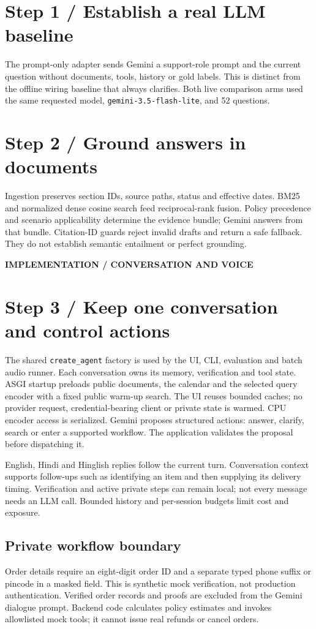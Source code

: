 \documentclass[10pt,a4paper]{article}
\newcommand{\tagline}[1]{{\small\bfseries\color{teal}#1}\par}
\begin{document}
\section{Step 1 / Establish a real LLM baseline}
The prompt-only adapter sends Gemini a support-role prompt and the current
question without documents, tools, history or gold labels. This is distinct from
the offline wiring baseline that always clarifies. Both live comparison arms
used the same requested model, \texttt{gemini-3.5-flash-lite}, and 52 questions.

\section{Step 2 / Ground answers in documents}
Ingestion preserves section IDs, source paths, status and effective dates.
BM25 and normalized dense cosine search feed reciprocal-rank fusion. Policy
precedence and scenario applicability determine the evidence bundle; Gemini
answers from that bundle. Citation-ID guards reject invalid drafts and return a
safe fallback. They do not establish semantic entailment or perfect grounding.

\newpage
\tagline{IMPLEMENTATION / CONVERSATION AND VOICE}
\section{Step 3 / Keep one conversation and control actions}
The shared \texttt{create\_agent} factory is used by the UI, CLI, evaluation and
batch audio runner. Each conversation owns its memory, verification and tool
state. ASGI startup preloads public documents, the calendar and the selected
query encoder with a fixed public warm-up search. The UI reuses bounded caches;
no provider request, credential-bearing client or private state is warmed.
CPU encoder access is serialized.
Gemini proposes structured actions: answer, clarify, search or enter a supported
workflow. The application validates the proposal before dispatching it.

English, Hindi and Hinglish replies follow the current turn. Conversation context
supports follow-ups such as identifying an item and then supplying its delivery
timing. Verification and active private steps can remain local; not every message
needs an LLM call. Bounded history and per-session budgets limit cost and exposure.

\subsection{Private workflow boundary}
Order details require an eight-digit order ID and a separate typed phone suffix
or pincode in a masked field. This is synthetic mock verification, not production
authentication. Verified order records and proofs are excluded from the Gemini
dialogue prompt. Backend code calculates policy estimates and invokes allowlisted
mock tools; it cannot issue real refunds or cancel orders.
\end{document}
